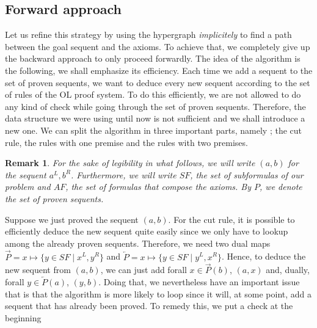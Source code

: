 \documentclass[a4paper, 11pt]{article}
\newtheorem*{remark}{Remark}
\begin{document}
    \subsection{Forward approach}
    Let us refine this strategy by using the
    hypergraph \textit{implicitely} to find a path between the goal sequent and the axioms. To achieve
    that, we completely give up the backward approach to only proceed forwardly. 
    The idea of the algorithm is the following, we shall emphasize its efficiency.
    Each time we add a sequent to the set of proven sequents, we want to deduce every new sequent
    according to the set of rules of the OL proof system.
    To do this efficiently, we are not allowed to do any kind of check while going through the set of
    proven sequents. Therefore, the data structure we were using until now is not sufficient
    and we shall introduce a new one. We can split the algorithm in three important parts, namely ;
    the cut rule, the rules with one premise and the rules with two premises. 
    \begin{remark}
	For the sake of legibility in what follows, we will write $(a,b)$ for the sequent $a^L,b^R$. 
	    Furthermore,
	    we will write $SF$, the set of subformulas of our problem and $AF$, the set of formulas
	    that compose the axioms. By $P$, we denote the set of proven sequents.
    \end{remark} 
    Suppose we just proved the sequent $(a,b)$. For the cut rule,
    it is possible to efficiently deduce the new sequent quite easily since we only have to
    lookup among the already proven sequents. Therefore, we need two dual maps 
    $\overrightarrow{P}=x\mapsto\{y\in SF\mid x^L,y^R\}$ and
    $\overleftarrow{P}=x\mapsto\{y\in SF\mid y^L,x^R\}$. Hence, to deduce
    the new sequent from $(a,b)$, we can just add forall $x\in\overrightarrow{P}(b)$, $(a,x)$ and,
    dually, forall $y\in\overleftarrow{P}(a)$, $(y,b)$. Doing that, we nevertheless have an important
    issue that is that the algorithm is more likely to loop since it will, at some point, add a sequent
    that has already been proved. To remedy this, we put a check at the beginning
\end{document}
